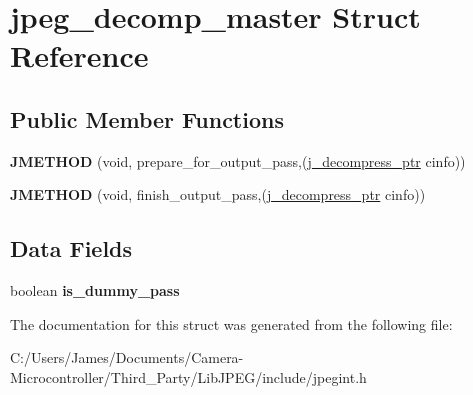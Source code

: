 \hypertarget{structjpeg__decomp__master}{}\section{jpeg\+\_\+decomp\+\_\+master Struct Reference}
\label{structjpeg__decomp__master}
\subsection*{Public Member Functions}
\begin{DoxyCompactItemize}
\item 
\mbox{\label{structjpeg__decomp__master_a9ec104ae8cbe2bc3f177999bf3f5f5e3}} 
{\bfseries J\+M\+E\+T\+H\+OD} (void, prepare\+\_\+for\+\_\+output\+\_\+pass,(\hyperlink{structjpeg__decompress__struct}{j\+\_\+decompress\+\_\+ptr} cinfo))
\item 
\mbox{\label{structjpeg__decomp__master_addca7f18cb529d96018d60a219679f6f}} 
{\bfseries J\+M\+E\+T\+H\+OD} (void, finish\+\_\+output\+\_\+pass,(\hyperlink{structjpeg__decompress__struct}{j\+\_\+decompress\+\_\+ptr} cinfo))
\end{DoxyCompactItemize}
\subsection*{Data Fields}
\begin{DoxyCompactItemize}
\item 
\mbox{\label{structjpeg__decomp__master_afda5d9594f27de3b07cbe0d35f80d0bc}} 
boolean {\bfseries is\+\_\+dummy\+\_\+pass}
\end{DoxyCompactItemize}


The documentation for this struct was generated from the following file\+:\begin{DoxyCompactItemize}
\item 
C\+:/\+Users/\+James/\+Documents/\+Camera-\/\+Microcontroller/\+Third\+\_\+\+Party/\+Lib\+J\+P\+E\+G/include/jpegint.\+h\end{DoxyCompactItemize}
